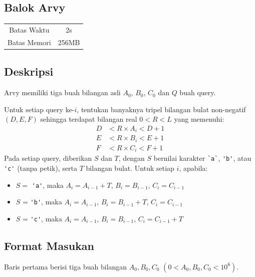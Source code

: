 \documentclass{article}
\begin{document}
\begin{center}
    \section*{Balok Arvy} %

    \begin{tabular}{ | c c | }
        \hline
        Batas Waktu  & 2s \\    %
        Batas Memori & 256MB \\  %
        \hline
    \end{tabular}
\end{center}

\subsection*{Deskripsi}

Arvy memiliki tiga buah bilangan asli $A_0$, $B_0$, $C_0$ dan $Q$ buah query.

Untuk setiap query ke-$i$, tentukan banyaknya tripel bilangan bulat non-negatif $\left(D, E, F\right)$ sehingga terdapat bilangan real $0 < R < L$ yang memenuhi:
\begin{align*}
D &< R \times A_i < D + 1 \\
E &< R \times B_i < E + 1 \\
F &< R \times C_i < F + 1
\end{align*}
Pada setiap query, diberikan $S$ dan $T$, dengan $S$ bernilai karakter \lstinline|`a`|, \lstinline|'b'|, atau \lstinline|'c'| (tanpa petik), serta $T$ bilangan bulat. Untuk setiap $i$, apabila:

\begin{itemize}

\item $S =$ \lstinline|'a'|, maka $A_i = A_{i - 1} + T$, $B_i = B_{i - 1}$, $C_i = C_{i - 1}$

\item $S$ = \lstinline|'b'|, maka $A_i = A_{i - 1}$, $B_i = B_{i - 1} + T$, $C_i = C_{i - 1}$

\item $S$ = \lstinline|'c'|, maka $A_i = A_{i - 1}$, $B_i = B_{i - 1}$, $C_i = C_{i - 1} + T$

\end{itemize}

\subsection*{Format Masukan}
Baris pertama berisi tiga buah bilangan $A_0, B_0, C_0$ $(0 < A_0, B_0, C_0 < 10^6)$.
\end{document}

